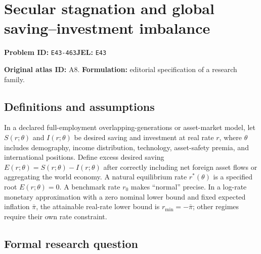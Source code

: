 \documentclass[11pt,a4paper]{article}
\begin{document}
\section*{Secular stagnation and global saving–investment imbalance}
\textbf{Problem ID:} \texttt{E43-463}\quad \textbf{JEL:} \texttt{E43}\par
\label{problem:OP-0018}
\label{atlas:prob:A8}

\noindent\textbf{Original atlas ID:} A8. \textbf{Formulation:} editorial specification of a research family.

\subsection*{Definitions and assumptions}

In a declared full-employment overlapping-generations or asset-market model, let $S(r;\theta)$ and $I(r;\theta)$ be desired saving and investment at real rate $r$, where $\theta$ includes demography, income distribution, technology, asset-safety premia, and international positions. Define excess desired saving $E(r;\theta)=S(r;\theta)-I(r;\theta)$ after correctly including net foreign asset flows or aggregating the world economy. A natural equilibrium rate $r^*(\theta)$ is a specified root $E(r;\theta)=0$. A benchmark rate $r_0$ makes ``normal'' precise. In a log-rate monetary approximation with a zero nominal lower bound and fixed expected inflation $\bar\pi$, the attainable real-rate lower bound is $r_{\min}=-\bar\pi$; other regimes require their own rate constraint.

\subsection*{Formal research question}
\end{document}

